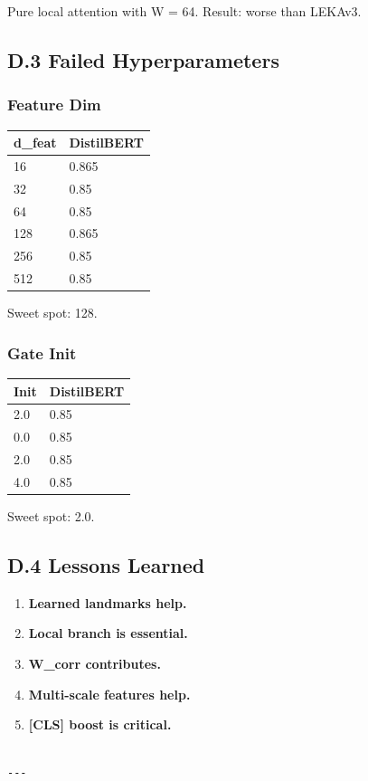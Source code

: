 Pure local attention with W = 64. Result: worse than LEKAv3.

\subsection{D.3 Failed Hyperparameters}

\subsubsection{Feature Dim}

\begin{table}[H]
\centering
\small
\begin{tabular}{ll}
\toprule
\textbf{d\_feat} & \textbf{DistilBERT} \\
\midrule
16 & 0.865 \\
32 & 0.85 \\
64 & 0.85 \\
128 & 0.865 \\
256 & 0.85 \\
512 & 0.85 \\
\bottomrule
\end{tabular}
\end{table}

Sweet spot: 128.

\subsubsection{Gate Init}

\begin{table}[H]
\centering
\small
\begin{tabular}{ll}
\toprule
\textbf{Init} & \textbf{DistilBERT} \\
\midrule
2.0 & 0.85 \\
0.0 & 0.85 \\
2.0 & 0.85 \\
4.0 & 0.85 \\
\bottomrule
\end{tabular}
\end{table}

Sweet spot: 2.0.

\subsection{D.4 Lessons Learned}

\begin{enumerate}
\item \textbf{Learned landmarks help.}
\item \textbf{Local branch is essential.}
\item \textbf{W\_corr contributes.}
\item \textbf{Multi-scale features help.}
\item \textbf{[CLS] boost is critical.}
\end{enumerate}
\begin{lstlisting}

---
\end{lstlisting}

